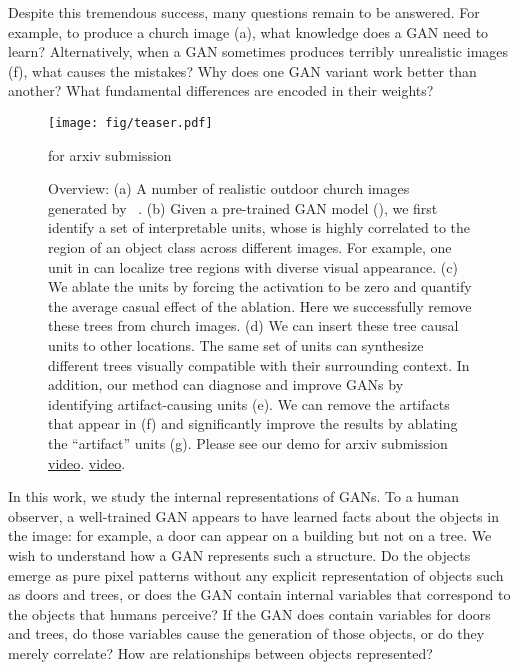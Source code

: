 \documentclass{article} %
\def\arxiv{for arxiv submission}
\begin{document}
Despite this tremendous success, many questions remain to be answered. For example, to produce a church image (a), what knowledge does a GAN need to learn? Alternatively, when a GAN sometimes produces terribly unrealistic images (f), what causes the mistakes? Why does one GAN variant work better than another? What fundamental differences are encoded in their weights?

\begin{figure}[t]
\vspace{-10pt}
\centering
\texttt{[image: fig/teaser.pdf]}
\vspace{-15pt}
\caption{Overview: (a) A number of realistic outdoor church images generated by \pgan~\citep{karras2018progressive}. (b) Given a pre-trained GAN model (\eg \pgan), we first identify a set of interpretable units, whose \featuremap is highly correlated to the region of an object class across different images. For example, one unit in  can localize tree regions with diverse visual appearance. (c) We ablate the units by forcing the activation to be zero and quantify the average casual effect of the ablation. Here we successfully remove these trees from church images.  (d) We can insert these tree causal units to other locations. The same set of units can synthesize different trees visually compatible with their surrounding context. In addition, our method can diagnose and improve GANs by  identifying artifact-causing units (e). We can remove the artifacts that appear in (f) and significantly improve the results by ablating the ``artifact'' units (g). Please see our demo
\ifdefined\arxiv
\href{http://tiny.cc/gandissect}{video}.
\else
\href{http://tiny.cc/iclrganvis}{video}.
\fi
}
\ifdefined\arxiv\else
\vspace{-20pt}
\fi
\end{figure}

In this work, we study the internal representations of GANs. To a human observer, a well-trained GAN appears to have learned facts about the objects in the image: for example, a door can appear on a building but not on a tree.  We wish to understand how a GAN represents such a structure.  Do the objects emerge as pure pixel patterns without any explicit representation of objects such as doors and trees, or does the GAN contain internal variables that correspond to the objects that humans perceive?  If the GAN does contain variables for doors and trees, do those variables cause the generation of those objects, or do they merely correlate?  How are relationships between objects represented?
\end{document}
